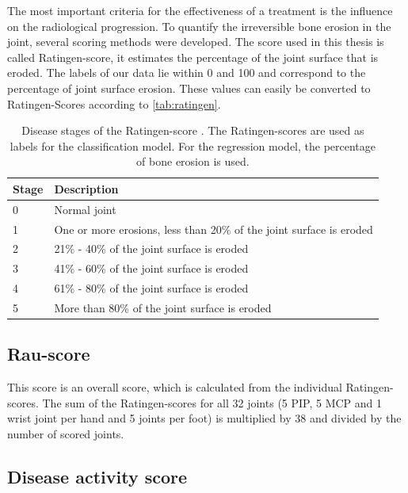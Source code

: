 \documentclass[12pt]{article}
\begin{document}
The most important criteria for the effectiveness of a treatment is the influence on the radiological progression. To quantify the irreversible bone erosion in the joint, several scoring methods were developed. The score used in this thesis is called Ratingen-score, it estimates the percentage of the joint surface that is eroded. \cite{rau_2007} The labels of our data lie within 0 and 100 and correspond to the percentage of joint surface erosion. These values can easily be converted to Ratingen-Scores according to \autoref{tab:ratingen}.


\begin{table}[ht]
\centering
\caption{Disease stages of the Ratingen-score \cite{rau_2007}. The Ratingen-scores are used as labels for the classification model. For the regression model, the percentage of bone erosion is used.}
\label{tab:ratingen}
\begin{tabular}{@{}ll@{}}
\toprule
Stage & Description                                                          \\ \midrule
0     & Normal joint                                                         \\
1     & One or more erosions, less than 20\% of the joint surface is eroded \\
2     & 21\% - 40\% of the joint surface is eroded                         \\
3     & 41\% - 60\% of the joint surface is eroded                         \\
4     & 61\% - 80\% of the joint surface is eroded                         \\
5     & More than 80\% of the joint surface is eroded                       \\ \bottomrule
\end{tabular}
\end{table}

\subsection{Rau-score}
\label{subsec:rau}

This score is an overall score, which is calculated from the individual Ratingen-scores. The sum of the Ratingen-scores for all 32 joints (5 PIP, 5 MCP and 1 wrist joint per hand and 5 joints per foot) is multiplied by 38 and divided by the number of scored joints.

\subsection{Disease activity score}
\label{subsec:das}
\end{document}

